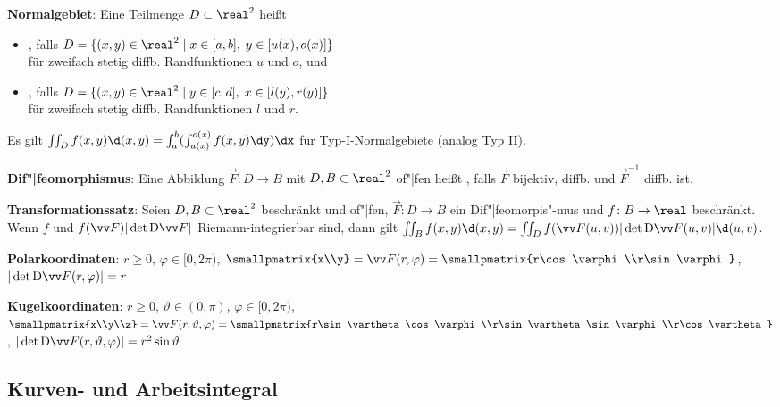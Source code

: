 \linie

\textbf{Normalgebiet}:
Eine Teilmenge $D \subset \real^2$ heißt
\begin{itemize}
    \item
    ,
    falls $D = \{(x, y) \in \real^2 \;|\; x \in [a, b],\; y \in [u(x), o(x)]\}$\\
    für zweifach stetig diffb. Randfunktionen $u$ und $o$, und
    
    \item
    ,
    falls $D = \{(x, y) \in \real^2 \;|\; y \in [c, d],\; x \in [l(y), r(y)]\}$\\
    für zweifach stetig diffb. Randfunktionen $l$ und $r$.
\end{itemize}
Es gilt $\iint_D f(x, y) \d(x,y) = \int_a^b (\int_{u(x)}^{o(x)} f(x, y) \dy) \dx$
für Typ-I-Normalgebiete (analog Typ II).

\linie

\textbf{Dif"|feomorphismus}:
Eine Abbildung $\vec{F}\colon D \to B$ mit $D, B \subset \real^2$ of"|fen
heißt , falls
$\vec{F}$ bijektiv, diffb. und $\vec{F}^{-1}$ diffb. ist.

\textbf{Transformationssatz}:
Seien $D, B \subset \real^2$ beschränkt und of"|fen,
$\vec{F}\colon D \to B$ ein Dif"|feomorpis"-mus und $f\colon B \to \real$ beschränkt.
Wenn $f$ und $f(\vec{F}) |\det \D\vec{F}|$ Riemann-integrierbar sind,
dann gilt $\iint_B f(x, y) \d(x, y) = \iint_D f(\vec{F}(u, v)) |\det \D\vec{F}(u, v)| \d(u,v)$.

\textbf{Polarkoordinaten}:
$r \ge 0$, $\varphi \in [0, 2\pi)$,
$\smallpmatrix{x\\y} = \vec{F}(r, \varphi) = \smallpmatrix{r\cos\varphi\\r\sin\varphi}$,
$|\det \D\vec{F}(r, \varphi)| = r$

\textbf{Kugelkoordinaten}:
$r \ge 0$, $\vartheta \in (0, \pi)$, $\varphi \in [0, 2\pi)$,\\
$\smallpmatrix{x\\y\\z} = \vec{F}(r, \vartheta, \varphi) =
\smallpmatrix{r\sin\vartheta\cos\varphi\\r\sin\vartheta\sin\varphi\\r\cos\vartheta}$,
$|\det \D\vec{F}(r, \vartheta, \varphi)| = r^2 \sin\vartheta$

\pagebreak

\subsection{%
    Kurven- und Arbeitsintegral%
}

